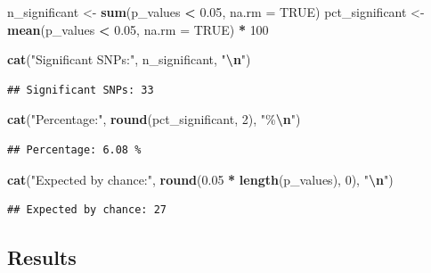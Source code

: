 \documentclass[
]{article}
\newenvironment{Shaded}{\begin{snugshade}}{\end{snugshade}}
\newcommand{\AttributeTok}[1]{\textcolor[rgb]{0.13,0.29,0.53}{#1}}
\newcommand{\ConstantTok}[1]{\textcolor[rgb]{0.56,0.35,0.01}{#1}}
\newcommand{\DecValTok}[1]{\textcolor[rgb]{0.00,0.00,0.81}{#1}}
\newcommand{\FloatTok}[1]{\textcolor[rgb]{0.00,0.00,0.81}{#1}}
\newcommand{\FunctionTok}[1]{\textcolor[rgb]{0.13,0.29,0.53}{\textbf{#1}}}
\newcommand{\NormalTok}[1]{#1}
\newcommand{\OtherTok}[1]{\textcolor[rgb]{0.56,0.35,0.01}{#1}}
\newcommand{\SpecialCharTok}[1]{\textcolor[rgb]{0.81,0.36,0.00}{\textbf{#1}}}
\newcommand{\StringTok}[1]{\textcolor[rgb]{0.31,0.60,0.02}{#1}}
\begin{document}
\begin{Shaded}
\begin{Highlighting}[]
\NormalTok{n\_significant }\OtherTok{\textless{}{-}} \FunctionTok{sum}\NormalTok{(p\_values }\SpecialCharTok{\textless{}} \FloatTok{0.05}\NormalTok{, }\AttributeTok{na.rm =} \ConstantTok{TRUE}\NormalTok{)}
\NormalTok{pct\_significant }\OtherTok{\textless{}{-}} \FunctionTok{mean}\NormalTok{(p\_values }\SpecialCharTok{\textless{}} \FloatTok{0.05}\NormalTok{, }\AttributeTok{na.rm =} \ConstantTok{TRUE}\NormalTok{) }\SpecialCharTok{*} \DecValTok{100}

\FunctionTok{cat}\NormalTok{(}\StringTok{"Significant SNPs:"}\NormalTok{, n\_significant, }\StringTok{"}\SpecialCharTok{\textbackslash{}n}\StringTok{"}\NormalTok{)}
\end{Highlighting}
\end{Shaded}

\begin{verbatim}
## Significant SNPs: 33
\end{verbatim}

\begin{Shaded}
\begin{Highlighting}[]
\FunctionTok{cat}\NormalTok{(}\StringTok{"Percentage:"}\NormalTok{, }\FunctionTok{round}\NormalTok{(pct\_significant, }\DecValTok{2}\NormalTok{), }\StringTok{"\%}\SpecialCharTok{\textbackslash{}n}\StringTok{"}\NormalTok{)}
\end{Highlighting}
\end{Shaded}

\begin{verbatim}
## Percentage: 6.08 %
\end{verbatim}

\begin{Shaded}
\begin{Highlighting}[]
\FunctionTok{cat}\NormalTok{(}\StringTok{"Expected by chance:"}\NormalTok{, }\FunctionTok{round}\NormalTok{(}\FloatTok{0.05} \SpecialCharTok{*} \FunctionTok{length}\NormalTok{(p\_values), }\DecValTok{0}\NormalTok{), }\StringTok{"}\SpecialCharTok{\textbackslash{}n}\StringTok{"}\NormalTok{)}
\end{Highlighting}
\end{Shaded}

\begin{verbatim}
## Expected by chance: 27
\end{verbatim}

\subsection{Results}\label{results}
\end{document}
